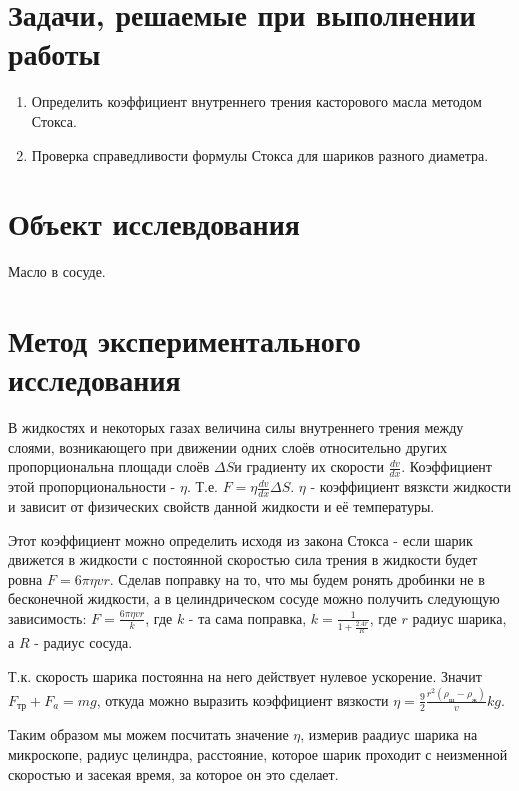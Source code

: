 \documentclass[a4paper]{article}
\begin{document}
\section{Задачи, решаемые при выполнении работы}
\begin{enumerate}
    \item Определить коэффициент внутреннего трения касторового
масла методом Стокса.
    \item Проверка справедливости формулы Стокса для шариков
разного диаметра.
\end{enumerate}

\section{Объект исслевдования}
Масло в сосуде.

\section{Метод экспериментального исследования}
В жидкостях и некоторых газах величина силы внутреннего трения между слоями, возникающего при движении одних слоёв относительно других пропорциональна площади слоёв $\Delta S$и градиенту их скорости $\frac{d v}{dx}$. Коэффициент этой пропорциональности - $\eta$. Т.е. $F = \eta \frac{dv}{dx} \Delta S$. $\eta$ - коэффициент вязксти жидкости и зависит от физических свойств данной жидкости и её температуры.

Этот коэффициент можно определить исходя из закона Стокса - если шарик движется в жидкости с постоянной скоростью сила трения в жидкости будет ровна $F = 6\pi\eta v r$. Сделав поправку на то, что мы будем ронять дробинки не в бесконечной жидкости, а в целиндрическом сосуде можно получить следующую зависимость: $F = \frac{6\pi \eta v r}{k}$,  где $k$ - та сама поправка, $k = \frac{1}{1 + \frac{2.4 r}{R}}$,  где $r$ радиус шарика, а $R$ - радиус сосуда.

Т.к. скорость шарика постоянна на него действует нулевое ускорение. Значит $F_{тр} + F_a= mg$, откуда можно выразить коэффициент вязкости $\eta = \frac{9}{2}\frac{r^2(\rho_ш - \rho_ж)}{v} k g$.

Таким образом мы можем посчитать значение $\eta$, измерив раадиус шарика на микроскопе, радиус целиндра, расстояние, которое шарик проходит с неизменной скоростью и засекая время, за которое он это сделает.
\end{document}
